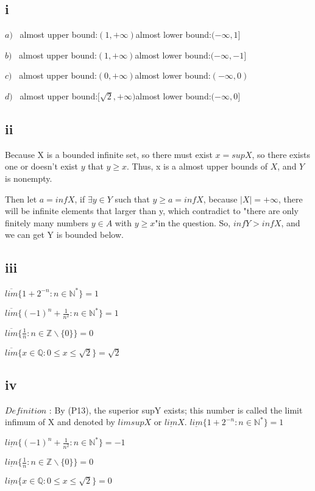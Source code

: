 \documentclass[11pt,twoside,a4paper]{article}
\begin{document}
\subsection{i}
$a)\,\,\,\,\,$almost upper bound:$(1,+\infty)$\quad  almost lower bound:$(-\infty,1]$ \par\noindent
$b)\,\,\,\,\,$almost upper bound:$(1,+\infty)$\quad  almost lower bound:$(-\infty,-1]$ \par\noindent
$c)\,\,\,\,\,$almost upper bound:$(0,+\infty)$\quad  almost lower bound:$(-\infty,0)$ \par\noindent
$d)\,\,\,\,\,$almost upper bound:$[\sqrt{2},+\infty)$\quad  almost lower bound:$(-\infty,0]$ \par\noindent

\subsection{ii}
Because X is a bounded infinite set, so there must exist $x = supX$, so there exists one or doesn't exist $y$ that $y \ge x$. Thus, x is a almost upper bounds of $X$, and $Y$ is nonempty.
\par\noindent
Then let $a=infX$,  if $\exists y \in Y$ such that $y\ge a=infX$, because $|X|=+\infty$, there will be infinite elements that larger than y, which contradict to  "there are only finitely many numbers $y \in A$ with $y \ge x$"in the question. So, $infY>infX$, and we can get Y is bounded below.


\subsection{iii}
$\overline{lim}\{1+2^{-n}: n \in \mathbb{N}^{*}   \}=1$ \par\noindent
$\displaystyle \overline{lim}\{(-1)^n +\frac{1}{n^2}:n \in  \mathbb{N}^{*}  \}=1$ \par\noindent
$\displaystyle \overline{lim}\{\frac{1}{n}: n \in \mathbb{Z}  \backslash \{0\}   \}=0$ \par\noindent
$\displaystyle \overline{lim}\{x \in \mathbb{Q}:0 \le x \le \sqrt{2}   \}=\sqrt{2}$ \par\noindent

\subsection{iv}
$Definition$ : By (P13), the superior  supY exists; this number is called the limit infimum of X and denoted by $lim supX$ or $\underline{lim}X$. 
$\underline{lim}\{1+2^{-n}: n \in \mathbb{N}^{*}   \}=1$ \par\noindent
$\displaystyle \underline{lim}\{(-1)^n +\frac{1}{n^2}:n \in  \mathbb{N}^{*}  \}=-1$ \par\noindent
$\displaystyle \underline{lim}\{\frac{1}{n}: n \in \mathbb{Z}  \backslash \{0\}   \}=0$ \par\noindent
$\displaystyle \underline{lim}\{x \in \mathbb{Q}:0 \le x \le \sqrt{2}   \}=0$ \par\noindent
\end{document}
